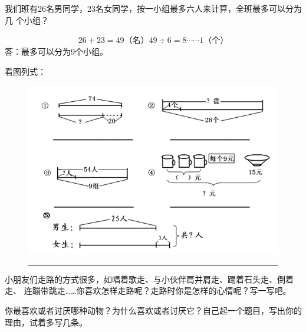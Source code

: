 \documentclass[a4paper, zihao = -4, unicodeGBMath, fontset=sourcesans, %
]{ctexart}
\begin{document}
\begin{qus}
  \item 我们班有26名男同学，23名女同学，按一小组最多六人来计算，全班最多可以分为几
    个小组？
    \begin{solution}[3cm]
      \begin{align*}
        26 + 23 = 49\text{（名）}
        49 \div 6 = 8 \cdots \cdots 1 \text{（个）}
      \end{align*}
      答：最多可以分为9个小组。
    \end{solution}

  \item 看图列式：
    \begin{figure}[ht]
      \centering
      \includegraphics[width = 0.9\linewidth]{shuxue}

      \rule[-2mm]{5cm}{2pt}\hspace*{2cm}
    \end{figure}

  \item 小朋友们走路的方式很多，如唱着歌走、与小伙伴肩并肩走、踢着石头走、倒着走、
    连蹦带跳走……你喜欢怎样走路呢？走路时你是怎样的心情呢？写一写吧。
    \begin{solution}[4cm]
      
    \end{solution}
    
\end{qus}
\clearpage


\begin{qus}

\item 你最喜欢或者讨厌哪种动物？为什么喜欢或者讨厌它？自己起一个题目，写出你的理由，试着多写几条。
  

\end{qus}
\end{document}
